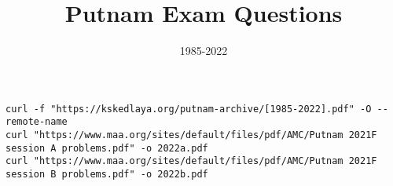 \documentclass{article}
\title{Putnam Exam Questions}
\date{1985-2022}
\begin{document}
\maketitle
\thispagestyle{empty}
\begin{center}
\begin{BVerbatim}
curl -f "https://kskedlaya.org/putnam-archive/[1985-2022].pdf" -O --remote-name
curl "https://www.maa.org/sites/default/files/pdf/AMC/Putnam 2021F session A problems.pdf" -o 2022a.pdf
curl "https://www.maa.org/sites/default/files/pdf/AMC/Putnam 2021F session B problems.pdf" -o 2022b.pdf
\end{BVerbatim}
\end{center}

\newpage





































%
\end{document}
